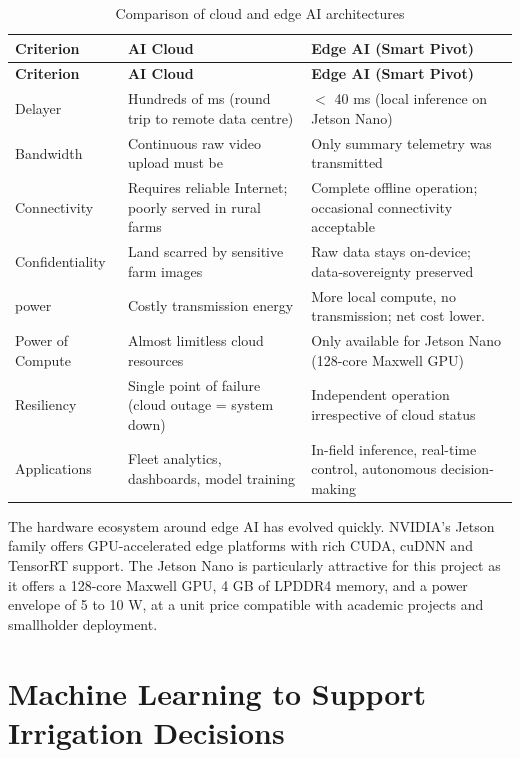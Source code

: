 \documentclass[12pt,a4paper]{report}
\renewcommand{\arraystretch}{1.25}
\begin{document}
\begingroup
\small
\setlength{\parskip}{0pt}
\setlength{\tabcolsep}{4pt}
\renewcommand{\arraystretch}{1.2}
\begin{longtable}{|P{0.20\textwidth}|P{0.34\textwidth}|P{0.34\textwidth}|}
\caption{Comparison of cloud and edge AI architectures}\\
\hline
\textbf{Criterion} & \textbf{AI Cloud} & \textbf{Edge AI (Smart Pivot)} \\ \hline
\endfirsthead
\hline
\textbf{Criterion} & \textbf{AI Cloud} & \textbf{Edge AI (Smart Pivot)} \\ \hline
\endhead
Delayer & Hundreds of ms (round trip to remote data centre) & $<$ 40 ms (local inference on Jetson Nano) \\ \hline
Bandwidth & Continuous raw video upload must be & Only summary telemetry was transmitted \\ \hline
Connectivity & Requires reliable Internet; poorly served in rural farms & Complete offline operation; occasional connectivity acceptable \\ \hline
Confidentiality & Land scarred by sensitive farm images & Raw data stays on-device; data-sovereignty preserved \\ \hline
power & Costly transmission energy & More local compute, no transmission; net cost lower. \\ \hline
Power of Compute & Almost limitless cloud resources & Only available for Jetson Nano (128-core Maxwell GPU) \\ \hline
Resiliency & Single point of failure (cloud outage = system down) & Independent operation irrespective of cloud status \\ \hline
Applications & Fleet analytics, dashboards, model training & In-field inference, real-time control, autonomous decision-making \\ \hline
\end{longtable}
\endgroup

The hardware ecosystem around edge AI has evolved quickly. NVIDIA's Jetson family offers GPU-accelerated edge platforms with rich CUDA, cuDNN and TensorRT support. The Jetson Nano is particularly attractive for this project as it offers a 128-core Maxwell GPU, 4 GB of LPDDR4 memory, and a power envelope of 5 to 10 W, at a unit price compatible with academic projects and smallholder deployment.

\section{Machine Learning to Support Irrigation Decisions}
\end{document}
